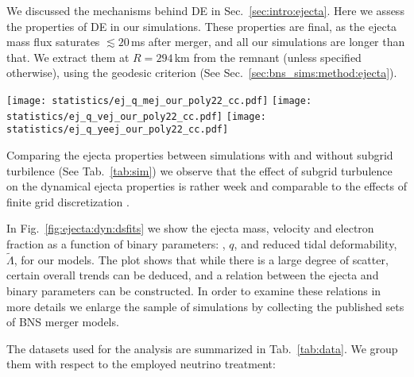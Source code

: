 We discussed the mechanisms behind \ac{DE} in Sec.~\ref{sec:intro:ejecta}. 
Here we assess the properties of \ac{DE} in our simulations. These properties 
are final, as the ejecta mass flux saturates ${\lesssim}20\,$ms after merger, 
and all our simulations are longer than that. We extract them at $R=294\,$km 
from the remnant (unless specified otherwise), using the geodesic criterion 
(See Sec.~\ref{sec:bns_sims:method:ejecta}). 

%
\begin{figure*}[t!]
    \centering 
    \texttt{[image: statistics/ej\_q\_mej\_our\_poly22\_cc.pdf]}
    \texttt{[image: statistics/ej\_q\_vej\_our\_poly22\_cc.pdf]}
    \texttt{[image: statistics/ej\_q\_yeej\_our\_poly22\_cc.pdf]}
    \caption{
        Mass, mass-averaged velocity and electron fraction for \ac{DE} 
        from our simulation as functions of binary parameters $q$ and $\tilde{\Lambda}$, 
        on the \textit{first}, \textit{second} and \textit{third} \textit{panels} 
        respectively. 
        In each panel, the lower suplot shows the relative difference 
        between the data and values inferred from the polynomial fitting 
        formula (see the text). 
        (Adapted from \citet{Nedora:2020pak})
    }
    \label{fig:ejecta:dyn:dsfits}
\end{figure*}
%
Comparing the ejecta properties between simulations with and 
without subgrid turbilence (See Tab.~\ref{tab:sim}) we observe 
that the effect of subgrid turbulence on the dynamical 
ejecta properties is rather week and comparable to the effects 
of finite grid discretization 
\citep{Bernuzzi:2020txg,Radice:2020ids}.

In Fig.~\ref{fig:ejecta:dyn:dsfits} we show the ejecta mass, velocity and 
electron fraction as a function of binary parameters: \mr{}, $q$, and 
reduced tidal deformability, $\tilde{\Lambda}$, for our models. 
The plot shows that while there is a large degree of scatter, certain 
overall trends can be deduced, and a relation between the ejecta and binary 
parameters can be constructed. 
%
In order to examine these relations in more details we enlarge the sample 
of simulations by collecting the published sets of \ac{BNS} merger models.
%
%

%
The datasets used for the analysis are summarized in Tab.~\ref{tab:data}.
We group them with respect to the employed neutrino treatment:

